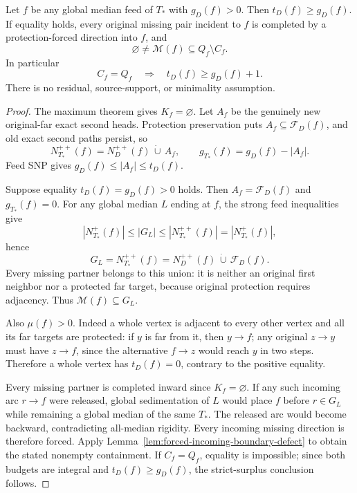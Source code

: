 \begin{theorem}
\label{thm:forced-balanced-feed-boundary}
Let $f$ be any global median feed of $T_*$ with $g_D(f)>0$.
Then $t_D(f)\ge g_D(f)$. If equality holds, every original missing
pair incident to $f$ is completed by a protection-forced direction
into $f$, and
\[
 \varnothing\ne\mathcal M(f)\subseteq Q_f\setminus C_f.
\]
In particular
\[
 C_f=Q_f\quad\Longrightarrow\quad t_D(f)\ge g_D(f)+1.
\]
There is no residual, source-support, or minimality assumption.
\end{theorem}
\begin{proof}
The maximum theorem gives $K_f=\varnothing$. Let $A_f$
be the genuinely new original-far exact second heads. Protection
preservation puts $A_f\subseteq\mathcal F_D(f)$, and old exact
second paths persist, so
\[
 N_{T_*}^{++}(f)=N_D^{++}(f)\,\dot\cup\,A_f,
 \qquad g_{T_*}(f)=g_D(f)-|A_f|.
\]
Feed SNP gives $g_D(f)\le|A_f|\le t_D(f)$.

Suppose equality $t_D(f)=g_D(f)>0$ holds. Then
$A_f=\mathcal F_D(f)$ and $g_{T_*}(f)=0$. For any global median
$L$ ending at $f$, the strong feed inequalities give
\[
 |N_{T_*}^{+}(f)|\le|G_L|\le|N_{T_*}^{++}(f)|
   =|N_{T_*}^{+}(f)|,
\]
hence
\[
 G_L=N_{T_*}^{++}(f)
     =N_D^{++}(f)\,\dot\cup\,\mathcal F_D(f).
\]
Every missing partner belongs to this union: it is neither an original
first neighbor nor a protected far target, because original protection
requires adjacency. Thus $\mathcal M(f)\subseteq G_L$.

Also $\mu(f)>0$. Indeed a whole vertex is adjacent to every other
vertex and all its far targets are protected: if $y$ is far from it,
then $y\to f$; any original $z\to y$ must have $z\to f$, since
the alternative $f\to z$ would reach $y$ in two steps. Therefore
a whole vertex has $t_D(f)=0$, contrary to the positive equality.

Every missing partner is completed inward since $K_f=\varnothing$.
If any such incoming arc $r\to f$ were released, global sedimentation
of $L$ would place $f$ before $r\in G_L$ while remaining a global
median of the same $T_*$. The released arc would become backward,
contradicting all-median rigidity. Every incoming missing direction
is therefore forced. Apply Lemma~\ref{lem:forced-incoming-boundary-defect}
to obtain the stated nonempty containment. If $C_f=Q_f$, equality is
impossible; since both budgets are integral and $t_D(f)\ge g_D(f)$,
the strict-surplus conclusion follows.
\end{proof}

